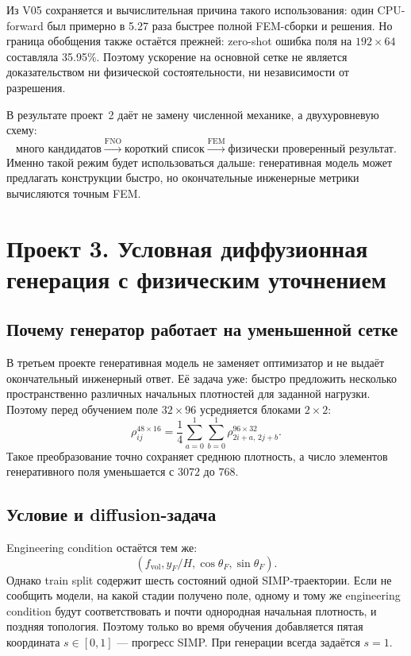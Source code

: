 Из V05 сохраняется и вычислительная причина такого использования: один CPU-forward был примерно в 5.27 раза быстрее полной FEM-сборки и решения. Но граница обобщения также остаётся прежней: zero-shot ошибка поля на $192\times64$ составляла 35.95\%. Поэтому ускорение на основной сетке не является доказательством ни физической состоятельности, ни независимости от разрешения.

В результате проект~2 даёт не замену численной механике, а двухуровневую схему:
\begin{equation}
\label{eq:practical-v06-screening-pipeline}
 \text{много кандидатов}
 \xrightarrow{\mathrm{FNO}}
 \text{короткий список}
 \xrightarrow{\mathrm{FEM}}
 \text{физически проверенный результат}.
\end{equation}
Именно такой режим будет использоваться дальше: генеративная модель может предлагать конструкции быстро, но окончательные инженерные метрики вычисляются точным FEM.

\section{Проект 3. Условная диффузионная генерация с физическим уточнением}

\subsection{Почему генератор работает на уменьшенной сетке}
\label{subsec:practical-v07-grid}

В третьем проекте генеративная модель не заменяет оптимизатор и не выдаёт окончательный инженерный ответ. Её задача уже: быстро предложить несколько пространственно различных начальных плотностей для заданной нагрузки. Поэтому перед обучением поле $32\times96$ усредняется блоками $2\times2$:
\begin{equation}
\label{eq:practical-v07-downsample}
 \rho^{48\times16}_{ij}
 =
 \frac{1}{4}
 \sum_{a=0}^{1}
 \sum_{b=0}^{1}
 \rho^{96\times32}_{2i+a,\,2j+b}.
\end{equation}
Такое преобразование точно сохраняет среднюю плотность, а число элементов генеративного поля уменьшается с $3072$ до $768$.

\subsection{Условие и diffusion-задача}
\label{subsec:practical-v07-condition}

Engineering condition остаётся тем же:
\begin{equation}
 \left(
 f_{\mathrm{vol}},
 y_F/H,
 \cos\theta_F,
 \sin\theta_F
 \right).
\end{equation}
Однако train split содержит шесть состояний одной SIMP-траектории. Если не сообщить модели, на какой стадии получено поле, одному и тому же engineering condition будут соответствовать и почти однородная начальная плотность, и поздняя топология. Поэтому только во время обучения добавляется пятая координата $s\in[0,1]$ --- прогресс SIMP. При генерации всегда задаётся $s=1$.

